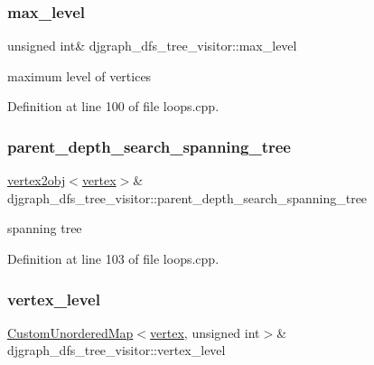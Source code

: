 \subsubsection{\texorpdfstring{max\+\_\+level}{max\_level}}
{\footnotesize\ttfamily unsigned int\& djgraph\+\_\+dfs\+\_\+tree\+\_\+visitor\+::max\+\_\+level\hspace{0.3cm}{\ttfamily [private]}}



maximum level of vertices 



Definition at line 100 of file loops.\+cpp.

\mbox{\label{structdjgraph__dfs__tree__visitor_adf4301f0b9fa023aa96ff606fc3a307a}} 
\subsubsection{\texorpdfstring{parent\+\_\+depth\+\_\+search\+\_\+spanning\+\_\+tree}{parent\_depth\_search\_spanning\_tree}}
{\footnotesize\ttfamily \hyperlink{structvertex2obj}{vertex2obj}$<$\hyperlink{graph_8hpp_abefdcf0544e601805af44eca032cca14}{vertex}$>$\& djgraph\+\_\+dfs\+\_\+tree\+\_\+visitor\+::parent\+\_\+depth\+\_\+search\+\_\+spanning\+\_\+tree\hspace{0.3cm}{\ttfamily [private]}}



spanning tree 



Definition at line 103 of file loops.\+cpp.

\mbox{\label{structdjgraph__dfs__tree__visitor_aa40978fd732b1b81d0eb185938acd673}} 
\subsubsection{\texorpdfstring{vertex\+\_\+level}{vertex\_level}}
{\footnotesize\ttfamily \hyperlink{custom__map_8hpp_ad1ed68f2ff093683ab1a33522b144adc}{Custom\+Unordered\+Map}$<$\hyperlink{graph_8hpp_abefdcf0544e601805af44eca032cca14}{vertex}, unsigned int$>$\& djgraph\+\_\+dfs\+\_\+tree\+\_\+visitor\+::vertex\+\_\+level\hspace{0.3cm}{\ttfamily [private]}}



